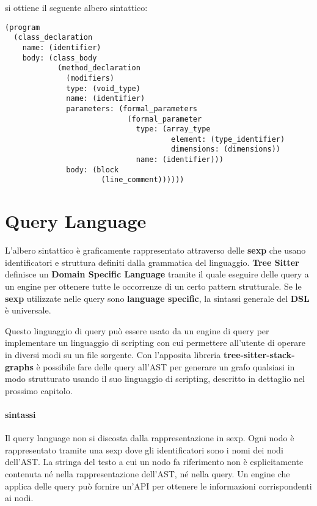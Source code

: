 si ottiene il seguente albero sintattico:

\begin{lstlisting}
(program
  (class_declaration
    name: (identifier)
    body: (class_body
            (method_declaration
              (modifiers)
              type: (void_type)
              name: (identifier)
              parameters: (formal_parameters
                            (formal_parameter
                              type: (array_type
                                      element: (type_identifier)
                                      dimensions: (dimensions))
                              name: (identifier)))
              body: (block
                      (line_comment))))))
\end{lstlisting}

\section{Query Language}

L'albero sintattico \`e graficamente rappresentato attraverso delle \textbf{sexp} che usano identificatori e struttura definiti dalla grammatica del linguaggio.
\textbf{Tree Sitter} definisce un \textbf{Domain Specific Language} \cite{TreeSitterQuerySyntax} tramite il quale eseguire delle query a un engine per ottenere tutte le occorrenze di un certo pattern strutturale.
Se le \textbf{sexp} utilizzate nelle query sono \textbf{language specific}, la sintassi generale del \textbf{DSL} \`e universale.

Questo linguaggio di query pu\`o essere usato da un engine di query per implementare un linguaggio di scripting con cui permettere all'utente di operare in diversi modi su un file sorgente.
Con l'apposita libreria \textbf{tree-sitter-stack-graphs} \`e possibile fare delle query all'AST per generare un grafo qualsiasi in modo strutturato usando il suo linguaggio di scripting, descritto in dettaglio nel prossimo capitolo.

\paragraph{sintassi}

Il query language non si discosta dalla rappresentazione in sexp.
Ogni nodo \`e rappresentato tramite una sexp dove gli identificatori sono i nomi dei nodi dell'AST.
La stringa del testo a cui un nodo fa riferimento non \`e esplicitamente contenuta n\'e nella rappresentazione dell'AST, n\'e nella query.
Un engine che applica delle query pu\`o fornire un'API per ottenere le informazioni corrispondenti ai nodi.

